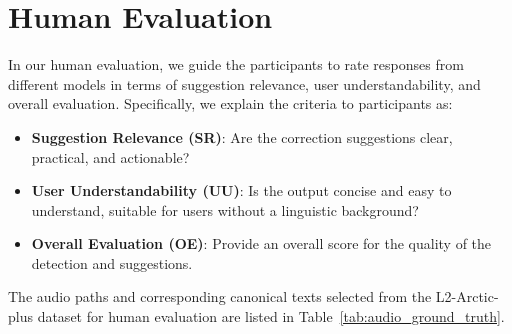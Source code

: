 \documentclass[11pt]{article}
\begin{document}

\section{Human Evaluation}
In our human evaluation, we guide the participants to rate responses from different models in terms of suggestion relevance, user understandability, and overall evaluation. Specifically, we explain the criteria to participants as:
\begin{itemize}
    \item \textbf{Suggestion Relevance (SR)}: Are the correction suggestions clear, practical, and actionable?
    \item \textbf{User Understandability (UU)}: Is the output concise and easy to understand, suitable for users without a linguistic background?
    \item \textbf{Overall Evaluation (OE)}: Provide an overall score for the quality of the detection and suggestions.
\end{itemize}

The audio paths and corresponding canonical texts selected from the L2-Arctic-plus dataset for human evaluation are listed in Table~\ref{tab:audio_ground_truth}. 
\end{document}
